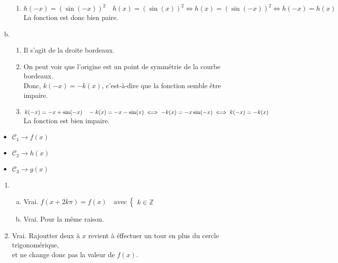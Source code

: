 \documentclass[12pt, a4paper]{article}
\begin{document}
\begin{Exercise}[number={81}]
\begin{enumerate}[a)]
\begin{enumerate}[1)]
                    \item $h(-x)=\left(\sin(-x)\right)^2 \quad h(x)=\left(\sin(x)\right)^2\iff h(x)=\left(\sin(-x)\right)^2\iff h(-x)=h(x)$ \\ La fonction est donc bien paire.
                \end{enumerate}\smallbreak
        \item   \begin{enumerate}[1)]
                    \item Il s'agit de la droite bordeaux.
                    \item On peut voir que l'origine est un point de symmétrie de la courbe bordeaux. \\ Donc, $k(-x)=-k(x)$, c'est-à-dire que la fonction semble être impaire.
                    \item $k(-x)=-x+\sin(-x) \quad -k(x)=-x-\sin(x)\iff -k(x)=-x\sin(-x)\\\iff k(-x)=-k(x)$ \quad La fonction est bien impaire.
                \end{enumerate}
    \end{enumerate}
\end{Exercise}

\begin{Exercise}[number={82}]
    \begin{itemize}
        \item $\mathcal{C}_1\longrightarrow f(x)$
        \item $\mathcal{C}_2\longrightarrow h(x)$
        \item $\mathcal{C}_3\longrightarrow g(x)$
    \end{itemize}
\end{Exercise}

\begin{Exercise}[number={83}]
    \begin{enumerate}[1)]
        \item   \begin{enumerate}[a)]
                    \item Vrai. $f(x+2k\pi)=f(x)\quad\text{avec}\ \begin{cases}k\in\mathbb{Z}\end{cases}$
                    \item Vrai. Pour la même raison.
                \end{enumerate}
        \item Vrai. Rajoutter deux à $x$ revient à éffectuer un tour en plus du cercle trigonomérique,\\\phantom{Vrai.} et ne change donc pas la valeur de $f(x)$.
    \end{enumerate}
\end{Exercise}
\end{document}
